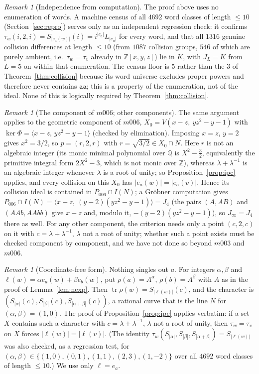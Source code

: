 \documentclass[11pt,a4paper]{article}
\theoremstyle{definition}
\theoremstyle{remark}
\newtheorem{remark}[theorem]{Remark}
\newcommand{\tr}{\operatorname{tr}}
\newcommand{\Q}{\mathbb{Q}}
\newcommand{\Z}{\mathbb{Z}}
\begin{document}
\begin{remark}[Independence from computation]
The proof above uses no enumeration of words. A machine census of all
$4692$ word classes of length $\le10$ (Section~\ref{sec:repro}) serves
only as an independent regression check: it confirms
$\tau_w(i,2,i)=S_{|e_a(w)|}(i)=i^{|e_a|}L_{|e_a|}$ for every word, and
that all $1316$ genuine collision differences at length $\le10$ (from
$1087$ collision groups, $546$ of which are purely ambient, i.e.\
$\tau_w=\tau_v$ already in $\Z[x,y,z]$) lie in $K$, with $J_L=K$ from
$L=5$ on within that enumeration. The census floor is $5$ rather than the
$3$ of Theorem~\ref{thm:collision} because its word universe excludes
proper powers and therefore never contains $\mathtt{aa}$; this is a
property of the enumeration, not of the ideal. None of this is logically
required by Theorem~\ref{thm:collision}.
\end{remark}

\begin{remark}[The component of $m006$; other components]
\label{rem:m006}
The same argument applies to the geometric component of $m006$,
$X_0=V(x-z,\ yz^2-y-1)$ with $\ker\Phi=\langle x-z,\,yz^2-y-1\rangle$
(checked by elimination). Imposing $x=z$, $y=2$ gives $x^2=3/2$, so
$p=(r,2,r)$ with $r=\sqrt{3/2}\in X_0\cap N$. Here $r$ is not an
algebraic integer (its monic minimal polynomial over $\Q$ is
$X^2-\tfrac32$, equivalently the primitive integral form
$2X^2-3$, which is not monic over $\Z$), whereas
$\lambda+\lambda^{-1}$ is an algebraic integer whenever $\lambda$ is a
root of unity; so Proposition~\ref{prop:ipc} applies, and every
collision on this $X_0$ has $|e_a(w)|=|e_a(v)|$. Hence its collision
ideal is contained in $P_{006}\cap I(N)$; a Gr\"obner computation gives
$P_{006}\cap I(N)=\langle x-z,\ (y-2)(yz^2-y-1)\rangle=J_4$ (the pairs
$(A,AB)$ and $(AAb,AAbb)$ give $x-z$ and, modulo it,
$-(y-2)(yz^2-y-1)$), so $J_\infty=J_4$ there as well. For any other
component, the criterion needs only a point $(c,2,c)$ on it with
$c=\lambda+\lambda^{-1}$, $\lambda$ not a root of unity; whether such a
point exists must be checked component by component, and we have not
done so beyond $m003$ and $m006$.
\end{remark}

\begin{remark}[Coordinate-free form]
Nothing singles out $a$. For integers $\alpha,\beta$ and
$\ell(w)=\alpha e_a(w)+\beta e_b(w)$, put $\rho(a)=A^{\alpha}$,
$\rho(b)=A^{\beta}$ with $A$ as in the proof of
Lemma~\ref{lem:nexp}. Then $\tr\rho(w)=S_{|\ell(w)|}(c)$, and the
character is $(S_{|\alpha|}(c),S_{|\beta|}(c),S_{|\alpha+\beta|}(c))$,
a rational curve that is the line $N$ for $(\alpha,\beta)=(1,0)$.
The proof of Proposition~\ref{prop:ipc} applies verbatim: if a set $X$
contains such a character with $c=\lambda+\lambda^{-1}$, $\lambda$ not a
root of unity, then $\tau_w=\tau_v$ on $X$ forces $|\ell(w)|=|\ell(v)|$.
(The identity $\tau_w(S_{|\alpha|},S_{|\beta|},S_{|\alpha+\beta|})=S_{|\ell(w)|}$
was also checked, as a regression test, for $(\alpha,\beta)\in\{(1,0),(0,1),
(1,1),(2,3),(1,-2)\}$ over all $4692$ word classes of length $\le10$.)
We use only $\ell=e_a$.
\end{remark}
\end{document}
